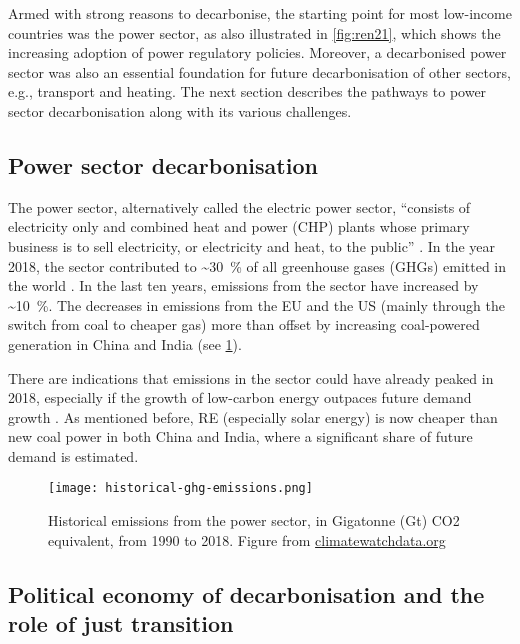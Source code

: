 \documentclass[../thesis.tex]{subfiles}
\begin{document}
Armed with strong reasons to decarbonise, the starting point for most low-income countries was the power sector, as also illustrated in \cref{fig:ren21}, which shows the increasing adoption of power regulatory policies. Moreover, a decarbonised power sector was also an essential foundation for future decarbonisation of other sectors, e.g., transport and heating. The next section describes the pathways to power sector decarbonisation along with its various challenges.

\subsection{Power sector decarbonisation}
The power sector, alternatively called the electric power sector, ``consists of electricity only and combined heat and power (CHP) plants whose primary business is to sell electricity, or electricity and heat, to the public'' \citep{eia}. In the year 2018, the sector contributed to \textasciitilde \SI{30}{\percent} of all greenhouse gases (GHGs) emitted in the world \citep{climatewatch}. In the last ten years, emissions from the sector have increased by \textasciitilde \SI{10}{\percent}. The decreases in emissions from the EU and the US (mainly through the switch from coal to cheaper gas) more than offset by increasing coal-powered generation in China and India (see \cref{fig:hist_power_emi}).

There are indications that emissions in the sector could have already peaked in 2018, especially if the growth of low-carbon energy outpaces future demand growth \citep{bertramCOVID192021,lolla}. As mentioned before, RE (especially solar energy) is now cheaper than new coal power in both China and India, where a significant share of future demand is estimated.

\begin{figure}[h!]
\centering
\texttt{[image: historical-ghg-emissions.png]}
\caption{Historical emissions from the power sector, in Gigatonne (Gt) CO2 equivalent, from 1990 to 2018. Figure from \url{climatewatchdata.org}}
\label{fig:hist_power_emi}
\end{figure}

\subsection{Political economy of decarbonisation and the role of just transition}\label{subsec:near_term}
\end{document}
